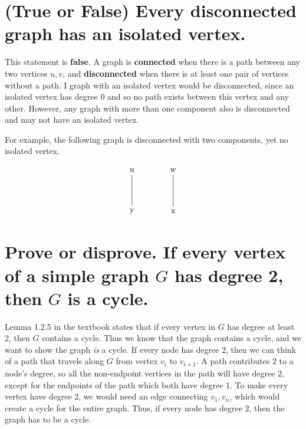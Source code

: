 \documentclass{article}
\begin{document}
\section{(True or False) Every disconnected graph has an isolated vertex.}
This statement is \textbf{false}.
A graph is \textbf{connected} when there is a path between any two vertices $u,v$, and \textbf{disconnected} when there is
at least one pair of vertices without a path.
I graph with an isolated vertex would be disconnected, since an isolated vertex has degree $0$ and so no path exists
between this vertex and any other.
However, any graph with more than one component also is disconnected and may not have an isolated vertex.

For example, the following graph is disconnected with two components,
yet no isolated vertex.

\begin{equation}
		\begin{tikzpicture}[node distance=5em]
			\node (u) at (0,0) {u};
			\node (y) [below of=u] {y};
			\node (w) [right of=u] {w};
			\node (x) [below of=w] {x};

			\path[-] (u) edge (y);
			\path[-] (w) edge (x);
		\end{tikzpicture}
\end{equation}

\section{Prove or disprove. If every vertex of a simple graph $G$ has degree 2, then $G$ is a cycle.}
Lemma 1.2.5 in the textbook states that if every vertex in $G$ has degree at least 2, then $G$ contains
a cycle.
Thus we know that the graph contains a cycle, and we want to show the graph \emph{is} a cycle.
If every node has degree $2$, then we can think of a path that travels along $G$ from vertex $v_i$ to 
$v_{i+1}$.
A path contributes $2$ to a node's degree, so all the non-endpoint vertices in the path will 
have degree 2, except for the endpoints of the path which both have degree $1$.
To make every vertex have degree $2$, we would need an edge connecting $v_1,v_n$, which would create
a cycle for the entire graph.
Thus, if every node has degree $2$, then the graph has to be a cycle.
\end{document}
